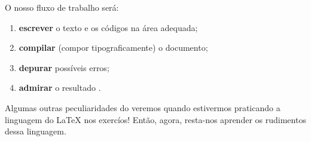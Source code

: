 O nosso fluxo de trabalho será:

\begin{enumerate}[\ding{226}]
  \item \textbf{\textsf{escrever}} o texto e os códigos na área adequada;
  \item \textbf{\textsf{compilar}} (compor tipograficamente) o documento;
  \item \textbf{\textsf{depurar}} possíveis erros;
  \item \textbf{\textsf{admirar}} o resultado .
\end{enumerate}

Algumas outras peculiaridades do \Overleaf{} veremos quando estivermos praticando
a linguagem do \LaTeX{} nos exercíos!
Então, agora, resta-nos aprender os rudimentos dessa linguagem.

\newpage